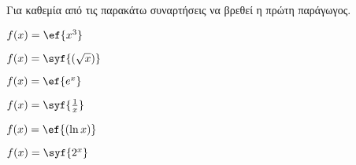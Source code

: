 Για καθεμία από τις παρακάτω συναρτήσεις να βρεθεί η πρώτη παράγωγος.
\begin{multicols}{2}
\begin{alist}
\item $ f(x)=\ef{x^3} $
\item $ f(x)=\syf{(\sqrt{x})} $
\item $ f(x)=\ef{e^x} $
\item $ f(x)=\syf{\frac{1}{x}} $
\item $ f(x)=\ef{(\ln{x})} $
\item $ f(x)=\syf{2^x} $
\end{alist}
\end{multicols}
